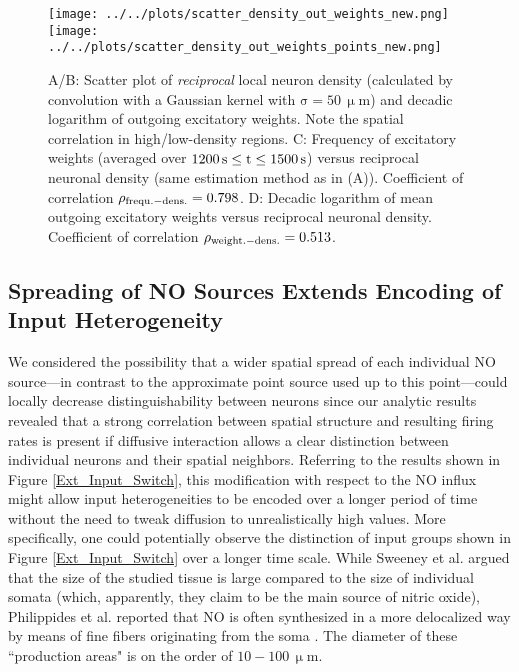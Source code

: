 \documentclass[10pt,a4paper]{article}
\begin{document}
\begin{figure}
\texttt{[image: ../../plots/scatter\_density\_out\_weights\_new.png]}
\texttt{[image: ../../plots/scatter\_density\_out\_weights\_points\_new.png]}
\caption[A/B: Scatter plot of reciprocal local neuron density and decadic logarithm of outgoing excitatory weights. C: Frequency of excitatory weights versus reciprocal neuronal density. D: Decadic logarithm of mean outgoing excitatory weights versus reciprocal neuronal density]{A/B: Scatter plot of \emph{reciprocal} local neuron density (calculated by convolution with a Gaussian kernel with $\mathrm{\sigma = 50\, \upmu m}$) and decadic logarithm of outgoing excitatory weights. Note the spatial correlation in high/low-density regions. C: Frequency of excitatory weights (averaged over $\rm 1200\,s \leq t \leq 1500\,s$) versus reciprocal neuronal density (same estimation method as in (A)). Coefficient of correlation $\rho_{\rm frequ.-dens.} = 0.798$. D: Decadic logarithm of mean outgoing excitatory weights versus reciprocal neuronal density. Coefficient of correlation $\rho_{\rm weight.-dens.} = 0.513$.}
\label{Inverse_Dens_vs_Sum_Out_Weights}
\end{figure}

\subsection{Spreading of NO Sources Extends Encoding of Input Heterogeneity}\label{NO_source_spread_section}
We considered the possibility that a wider spatial spread of each individual NO source---in contrast to the approximate point source used up to this point---could locally decrease distinguishability between neurons since our analytic results revealed that a strong correlation between spatial structure and resulting firing rates is present if diffusive interaction allows a clear distinction between individual neurons and their spatial neighbors. Referring to the results shown in Figure \ref{Ext_Input_Switch}, this modification with respect to the NO influx might allow input heterogeneities to be encoded over a longer period of time without the need to tweak diffusion to unrealistically high values. More specifically, one could potentially observe the distinction of input groups shown in Figure \ref{Ext_Input_Switch} over a longer time scale.  While Sweeney et al. argued that the size of the studied tissue is large compared to the size of individual somata (which, apparently, they claim to be the main source of nitric oxide), Philippides et al. reported that NO is often synthesized in a more delocalized way by means of fine fibers originating from the soma \cite{Philippides_2005}. The diameter of these ``production areas" is on the order of $\mathrm{10-100\, \upmu m}$.
\end{document}
